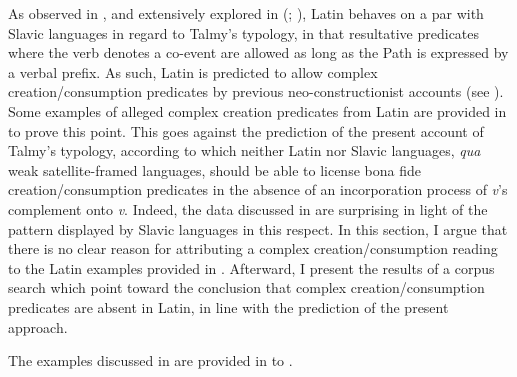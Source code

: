 \documentclass[output=paper,colorlinks,citecolor=brown]{langscibook}
\begin{document}
As observed in \citet{Talmy2000}, and extensively explored in \citeauthor{Acedo-Matellan2010} (\citeyear{Acedo-Matellan2010}; \citeyear{Acedo-Matellan2016}), Latin behaves on a par with Slavic languages in regard to Talmy's typology, in that resultative predicates where the verb denotes a co-event are allowed as long as the Path is expressed by a verbal prefix. As such, Latin is predicted to allow complex creation/consumption predicates by previous neo-constructionist accounts (see ). %
Some examples of alleged complex creation predicates from Latin are provided in \citet{Acedo-Matellan2016} to prove this point. This goes against the prediction of the present account of Talmy's typology, according to which neither Latin nor Slavic languages, \textit{qua} weak satellite-framed languages, should be able to license bona fide creation/consumption predicates in the absence of an incorporation process of \textit{v}'s complement onto \textit{v}. Indeed, the data discussed in \citet{Acedo-Matellan2016} are surprising in light of the pattern displayed by Slavic languages in this respect. 
In this section, I argue that there is no clear reason for attributing a complex creation/consumption reading to the Latin examples provided in \citet{Acedo-Matellan2016}.
Afterward, I present the results of a corpus search which point toward the conclusion that complex creation/consumption predicates are absent in Latin, in line with the prediction of the present approach.

The examples discussed in \citet{Acedo-Matellan2016} are provided in  to .
\end{document}
